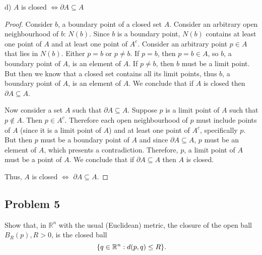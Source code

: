\documentclass{article}
\newcommand{\R}{\mathbb{R}}
\DeclarePairedDelimiter{\set}{ \{ }{ \} }
\begin{document}
\begin{tcolorbox}
d) $A$ is closed $\iff \partial A \subseteq A$ 
\end{tcolorbox}

\begin{proof}

Consider $b$, a boundary point of a closed set $A$.
Consider an arbitrary open neighbourhood of $b$: $N(b)$.
Since $b$ is a boundary point, $N(b)$ contains at least one point of $A$ and at least one point of $A^c$.
Consider an arbitrary point $p \in A$ that lies in $N(b)$.
Either $p = b$ or $p \neq b$. If $p = b$, then $p = b \in A$, so $b$, a boundary point of $A$, is an element of $A$.
If $p \neq b$, then $b$ must be a limit point.
But then we know that a closed set contains all its limit points, thus $b$, a boundary point of $A$, is an element of $A$.
We conclude that if $A$ is closed then $\partial A \subseteq A$.

Now consider a set $A$ such that $\partial A \subseteq A$.
Suppose $p$ is a limit point of $A$ such that $p \notin A$. Then $p \in A^c$.
Therefore each open neighbourhood of $p$ must include points of $A$ (since it is a limit point of $A$) and at least one point of $A^c$, specifically $p$.
But then $p$ must be a boundary point of $A$ and since $\partial A \subseteq A$, $p$ must be an element of $A$, which presents a contradiction.
Therefore, $p$, a limit point of $A$ must be a point of $A$. We conclude that if $\partial A \subseteq A$ then $A$ is closed.

Thus, $A$ is closed $\iff$ $\partial A \subseteq A$.

\end{proof}


\subsection*{Problem 5}

\begin{tcolorbox}
Show that, in $\R^n$ with the usual (Euclidean) metric, the closure of the open ball $B_R(p), R > 0$, is the closed ball
\[ \set{ q \in \R^n : d(p ,q) \leq R }. \]
\end{tcolorbox}
\end{document}
